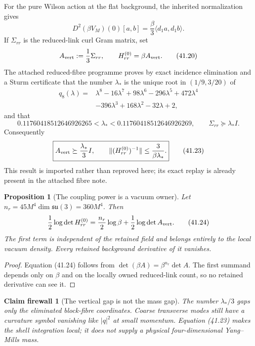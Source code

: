 \documentclass[11pt,oneside]{book}
\newtheorem{proposition}[theorem]{Proposition}
\newtheorem{firewall}[theorem]{Claim firewall}
\theoremstyle{definition}
\theoremstyle{remark}
\begin{document}
For the pure Wilson action at the flat background, the inherited
normalization gives
\[
 D^2(\beta V_M)(0)[a,b]
 =\frac{\beta}{3}\langle d_1a,d_1b\rangle.                      \tag{41.19}
\]
If \(\Sigma_{rr}\) is the reduced-link curl Gram matrix, set
\[
 A_{\rm vert}:=\frac13\Sigma_{rr},
 \qquad H_{rr}^{(0)}=\beta A_{\rm vert}.                         \tag{41.20}
\]
The attached reduced-fibre programme proves by exact incidence
elimination and a Sturm certificate that the number \(\lambda_*\)
is the unique root in \((1/9,3/20)\) of
\[
 \begin{split}
 q_8(\lambda)={}&\lambda^8-16\lambda^7+98\lambda^6-296\lambda^5
 +472\lambda^4\\
 &-396\lambda^3+168\lambda^2-32\lambda+2,
 \end{split}                                                     \tag{41.21}
\]
and that
\[
 0.11760418512646926265<\lambda_*
 <0.11760418512646926269,\qquad
 \Sigma_{rr}\succeq\lambda_*I.                                  \tag{41.22}
\]
Consequently
\[
 \boxed{
 A_{\rm vert}\succeq\frac{\lambda_*}{3}I,
 \qquad
 \|(H_{rr}^{(0)})^{-1}\|
 \leq\frac{3}{\beta\lambda_*}.}                                 \tag{41.23}
\]
This result is imported rather than reproved here; its exact replay
is already present in the attached fibre note.

\begin{proposition}[The coupling power is a vacuum owner]
\label{prop:e8v41-beta-vacuum}
Let \(n_r=45M^4\dim\mathfrak{su}(3)=360M^4\).  Then
\[
 \frac12\log\det H_{rr}^{(0)}
 =\frac{n_r}{2}\log\beta+\frac12\log\det A_{\rm vert}.           \tag{41.24}
\]
The first term is independent of the retained field and belongs
entirely to the local vacuum density.  Every retained background
derivative of it vanishes.
\end{proposition}

\begin{proof}
Equation (41.24) follows from
\(\det(\beta A)=\beta^{n_r}\det A\).  The first summand depends only
on \(\beta\) and on the locally owned reduced-link count, so no
retained derivative can see it.
\end{proof}

\begin{firewall}[The vertical gap is not the mass gap]
\label{fire:e8v41-vertical-not-mass}
The number \(\lambda_*/3\) gaps only the eliminated block-fibre
coordinates.  Coarse transverse modes still have a curvature symbol
vanishing like \(|q|^2\) at small momentum.  Equation (41.23) makes
the shell integration local; it does not supply a physical
four-dimensional Yang--Mills mass.
\end{firewall}
\end{document}
